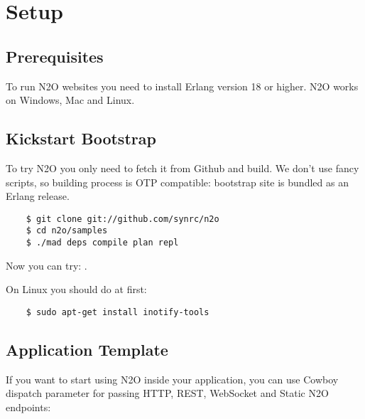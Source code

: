 \section{Setup}

\subsection{Prerequisites}
To run N2O websites you need to install Erlang version 18 or higher.
N2O works on Windows, Mac and Linux.

\subsection{Kickstart Bootstrap}
To try N2O you only need to fetch it from Github and build. We don't use
fancy scripts, so building process is OTP compatible: bootstrap site
is bundled as an Erlang release.

\vspace{1\baselineskip}
\begin{lstlisting}
    $ git clone git://github.com/synrc/n2o
    $ cd n2o/samples
    $ ./mad deps compile plan repl
\end{lstlisting}
\vspace{1\baselineskip}

Now you can try: .

On Linux you should do at first:

\vspace{1\baselineskip}
\begin{lstlisting}
    $ sudo apt-get install inotify-tools
\end{lstlisting}
\vspace{1\baselineskip}

\newpage
\subsection{Application Template}
If you want to start using N2O inside your application, you can use Cowboy dispatch parameter
for passing HTTP, REST, WebSocket and Static N2O endpoints:

